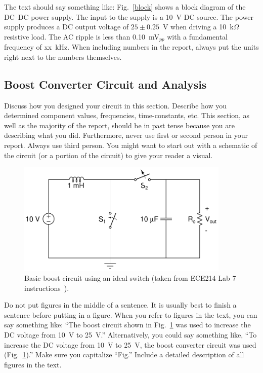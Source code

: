 \documentclass[11pt]{article}
\begin{document}
The text should say something like: Fig.~\ref{block} shows a block diagram of the DC--DC power supply. The input to the supply is a 10~V DC source. The power supply produces a DC output voltage of $25 \pm 0.25$~V when driving a 10~k$\Omega$ resistive load. The AC ripple is less than 0.10~mV$_{pp}$ with a fundamental frequency of xx~kHz. When including numbers in the report, always put the units right next to the numbers themselves.



\subsection{Boost Converter Circuit and Analysis}

Discuss how you designed your circuit in this section. Describe how you determined component values, frequencies, time-constants, etc. This section, as well as the majority of the report, should be in past tense because you are describing what you did. Furthermore, never use first or second person in your report. Always use third person. You might want to start out with a schematic of the circuit (or a portion of the circuit) to give your reader a visual. 

\begin{figure}[ht]
\centering
\includegraphics[width=4in]{boostcircuit}
\caption{Basic boost circuit using an ideal switch (taken from ECE214 Lab 7 instructions~\cite{ECE214_lab7}).}
\label{boostconverter}
\end{figure}

Do not put figures in the middle of a sentence. It is usually best to finish a sentence before putting in a figure. When you refer to figures in the text, you can say something like: ``The boost circuit shown in Fig.~\ref{boostconverter} was used to increase the DC voltage from 10~V to 25~V.'' Alternatively, you could say something like, ``To increase the DC voltage from 10~V to 25~V, the boost converter circuit was used (Fig.~\ref{boostconverter}).'' Make sure you capitalize ``Fig.'' Include a detailed description of all figures in the text.  
\end{document}
